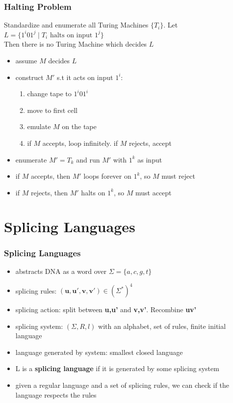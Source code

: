 \documentclass{beamer}
\begin{document}

\begin{frame}
\frametitle{Halting Problem}
\begin{theorem}
  Standardize and enumerate all Turing Machines $\{T_i\}$. Let $L = \{1^i01^j
  \mid T_i \text{ halts on input } 1^j\}$\\
  Then there is no Turing Machine which decides $L$
\end{theorem}
\begin{itemize}
\item assume $M$ decides $L$
\item construct $M'$ s.t it acts on input $1^i$:
  \begin{enumerate}
  \item change tape to $1^i01^i$
  \item move to first cell
  \item emulate $M$ on the tape
  \item if $M$ accepts, loop infinitely. if $M$ rejects, accept
  \end{enumerate}
\item enumerate $M' = T_k$ and run $M'$ with $1^k$ as input 
\item if $M$ accepts, then $M'$ loops forever on $1^k$, so $M$ must reject
\item if $M$ rejects, then $M'$ halts on $1^k$, so $M$ must accept
\end{itemize}
\end{frame}


\section{Splicing Languages}
\begin{frame}
\frametitle{Splicing Languages}
\begin{itemize}
  \item abstracts DNA as a word over $\Sigma = \{a, c, g, t\}$
  \item splicing rules: $(\mathbf{u, u', v, v'}) \in (\Sigma^*)^4$
  \item splicing action: split between \textbf{u,u'} and \textbf{v,v'}.
    Recombine \textbf{uv'}
  \item splicing system: $(\Sigma, R, l)$ with an alphabet, set of rules,
    finite initial language
  \item language generated by system: smallest closed language
  \item L is a \textbf{splicing language} if it is generated by some splicing system
  \item given a regular language and a set of splicing rules, we can check if
    the language respects the rules
\end{itemize}
\end{frame}
\end{document}
